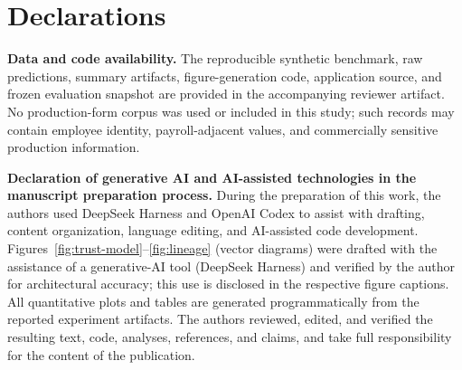 \section*{Declarations}

\textbf{Data and code availability.} The reproducible synthetic benchmark, raw predictions, summary artifacts, figure-generation code, application source, and frozen evaluation snapshot are provided in the accompanying reviewer artifact. No production-form corpus was used or included in this study; such records may contain employee identity, payroll-adjacent values, and commercially sensitive production information.

\textbf{Declaration of generative AI and AI-assisted technologies in the manuscript preparation process.} During the preparation of this work, the authors used DeepSeek Harness and OpenAI Codex to assist with drafting, content organization, language editing, and AI-assisted code development. Figures~\ref{fig:trust-model}--\ref{fig:lineage} (vector diagrams) were drafted with the assistance of a generative-AI tool (DeepSeek Harness) and verified by the author for architectural accuracy; this use is disclosed in the respective figure captions. All quantitative plots and tables are generated programmatically from the reported experiment artifacts. The authors reviewed, edited, and verified the resulting text, code, analyses, references, and claims, and take full responsibility for the content of the publication.
